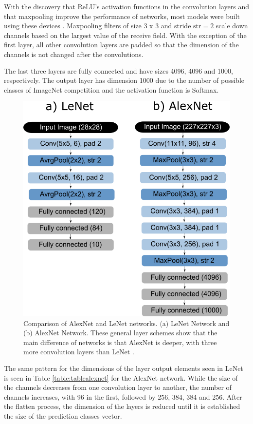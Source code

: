 With the discovery that ReLU's activation functions in the convolution layers and that maxpooling improve the performance of networks, most models were built using these devices \cite{zhang2020dive}. Maxpooling filters of size $3\text{ x }3$ and stride $\text{str} = 2$ scale down channels based on the largest value of the receive field. With the exception of the first layer, all other convolution layers are padded so that the dimension of the channels is not changed after the convolutions.

The last three layers are fully connected and have sizes 4096, 4096 and 1000, respectively. The output layer has dimension 1000 due to the number of possible classes of ImageNet competition and the activation function is Softmax.

\begin{figure}
    \centering
    \includegraphics[scale=0.4]{images/figure129.png}
    \caption{ Comparison of AlexNet and LeNet networks. (a) LeNet Network and (b)  AlexNet Network. These general layer schemes show that the main difference of networks is that AlexNet is deeper, with three more convolution layers than LeNet \cite{zhang2020dive}.}
    \label{fig:lenetalexnet}
\end{figure}

The same pattern for the dimensions of the layer output elements seen in LeNet is seen in Table \ref{table:tablealexnet} for the AlexNet network. While the size of the channels decreases from one convolution layer to another, the number of channels increases, with 96 in the first, followed by 256, 384, 384 and 256. After the flatten process, the dimension of the layers is reduced until it is established the size of the prediction classes vector.

